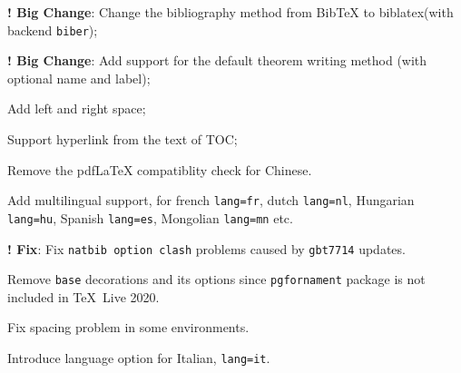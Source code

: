 \documentclass[11pt]{boyogalaelegantbook}
\begin{document}
\begin{change}
  \item \textbf{! Big Change}: Change the bibliography method from \textsf{BibTeX} to biblatex(with backend  \lstinline{biber});
  \item \textbf{! Big Change}: Add support for the default theorem writing method (with optional name and label);
  \item Add left and right space;
  \item Support hyperlink from the text of TOC;
  \item Remove the \textsf{pdfLaTeX} compatiblity check for Chinese.
  \item Add multilingual support, for french \lstinline{lang=fr}, dutch \lstinline{lang=nl}, Hungarian  \lstinline{lang=hu}, Spanish \lstinline{lang=es}, Mongolian \lstinline{lang=mn} etc.
\end{change}



\begin{change}
  \item \textbf{! Fix}: Fix \lstinline{natbib option clash} problems caused by \lstinline{gbt7714} updates.
  \item Remove \lstinline{base} decorations and its options since \lstinline{pgfornament} package is not included in \TeX~Live 2020.
  \item Fix spacing problem in some environments.
  \item Introduce language option for Italian, \lstinline{lang=it}.
\end{change}


\end{document}

